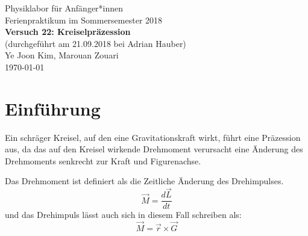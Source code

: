 \documentclass[11pt,a4paper]{article} %
\begin{document}
{
	\centering 
	\large 
	Physiklabor für Anfänger*innen \\
	Ferienpraktikum im Sommersemester 2018 \\[4mm]
	\textbf{\LARGE 
		Versuch 22: Kreiselpräzession
	} \\[3mm]
	(durchgeführt am 21.09.2018 bei Adrian Hauber) \\
	Ye Joon Kim, Marouan Zouari\\
	\today \\[10mm]
}

\section{Einführung}
Ein schräger Kreisel, auf den eine Gravitationskraft wirkt, führt eine Präzession aus, da das auf den Kreisel wirkende Drehmoment verursacht eine Änderung des Drehmoments senkrecht zur Kraft und Figurenachse.

Das Drehmoment ist definiert als die Zeitliche Änderung des Drehimpulses. 
\begin{equation}
\vec{M} = \frac{d\vec{L}}{dt}
\end{equation}
und das Drehimpuls lässt auch sich in diesem Fall schreiben als:
\begin{equation}
\vec{M} =\vec{r}\times\vec{G}
\end{equation}
\end{document}
